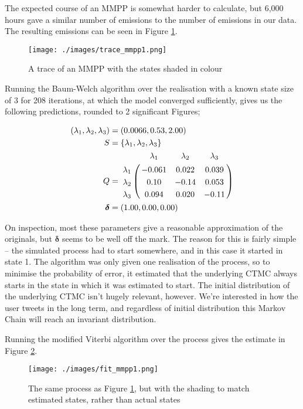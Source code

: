 The expected course of an MMPP is somewhat harder to calculate, but 6,000 hours gave a similar number of emissions to the number of emissions in our data. The resulting emissions can be seen in Figure \ref{trace_mmpp1}.

\clearpage
\begin{figure}[h!]
\centering
\texttt{[image: ./images/trace\_mmpp1.png]}
\caption{A trace of an MMPP with the states shaded in colour \protect\footnotemark }
\label{trace_mmpp1}
\end{figure}

Running the Baum-Welch algorithm over the realisation with a known state size of 3 for 208 iterations, at which the model converged sufficiently, gives us the following predictions, rounded to 2 significant Figures;

\begin{align*}
(\lambda_1,\lambda_2,\lambda_3) &= (0.0066,0.53,2.00)\\
S &= \{\lambda_1,\lambda_2,\lambda_3\}\\
Q &= \bordermatrix{      & \lambda_1 & \lambda_2 & \lambda_3\cr
                \lambda_1 & -0.061 & 0.022 & 0.039 \cr
                \lambda_2 & 0.10 & -0.14 & 0.053 \cr
                \lambda_3 & 0.094 & 0.020 & -0.11 \cr
			}\\
\bm{\delta} &= (1.00,0.00,0.00)
\end{align*}

On inspection, most these parameters give a reasonable approximation of the originals, but $\bm{\delta}$ seems to be well off the mark. The reason for this is fairly simple -- the simulated process had to start somewhere, and in this case it started in state 1. The algorithm was only given one realisation of the process, so to minimise the probability of error, it estimated that the underlying CTMC always starts in the state in which it was estimated to start. The initial distribution of the underlying CTMC isn't hugely relevant, however. We're interested in how the user tweets in the long term, and regardless of initial distribution this Markov Chain will reach an invariant distribution.

Running the modified Viterbi algorithm over the process gives the estimate in Figure \ref{fit_mmpp1}.

\begin{figure}[h!]
\centering
\texttt{[image: ./images/fit\_mmpp1.png]}
\caption{The same process as Figure \ref{trace_mmpp1}, but with the shading to match estimated states, rather than actual states}
\label{fit_mmpp1}
\end{figure}

